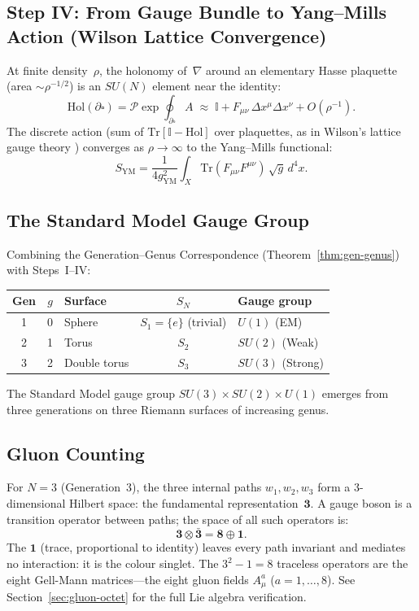 \documentclass[11pt, a4paper, openany]{book}
\newcounter{thm}[chapter]
\begin{document}
\subsection{Step IV: From Gauge Bundle to Yang--Mills Action
  (Wilson Lattice Convergence)}

At finite density~$\rho$, the holonomy of~$\nabla$ around an elementary
Hasse plaquette (area $\sim \rho^{-1/2}$) is an $SU(N)$ element near
the identity:
\[
  \mathrm{Hol}(\partial\square) = \mathcal{P}\exp\!\oint_{\partial\square}
  A \;\approx\; \mathbb{I} + F_{\mu\nu}\,\Delta x^\mu \Delta x^\nu
  + O(\rho^{-1}).
\]
The discrete action (sum of
$\mathrm{Tr}[\mathbb{I} - \mathrm{Hol}]$ over plaquettes, as in
Wilson's lattice gauge theory \cite{wilson1974}) converges as
$\rho \to \infty$ to the Yang--Mills functional:
\begin{equation}\label{eq:yang-mills}
  S_{\mathrm{YM}} = \frac{1}{4g_{\mathrm{YM}}^2}
  \int_X \mathrm{Tr}(F_{\mu\nu}F^{\mu\nu})\,\sqrt{g}\,d^4x.
\end{equation}

\subsection{The Standard Model Gauge Group}

Combining the Generation--Genus Correspondence
(Theorem~\ref{thm:gen-genus}) with Steps~I--IV:

\begin{center}\small
\begin{tabular}{@{}cclcl@{}}
\toprule
Gen & $g$ & Surface & $S_N$ & Gauge group \\
\midrule
1 & 0 & Sphere & $S_1 = \{e\}$ (trivial) & $U(1)$ (EM) \\
2 & 1 & Torus  & $S_2$ & $SU(2)$ (Weak) \\
3 & 2 & Double torus & $S_3$ & $SU(3)$ (Strong) \\
\bottomrule
\end{tabular}
\end{center}

\noindent
The Standard Model gauge group $SU(3) \times SU(2) \times U(1)$
emerges from three generations on three Riemann surfaces of
increasing genus.

\subsection{Gluon Counting}

For $N = 3$ (Generation~3), the three internal paths
$w_1, w_2, w_3$ form a 3-dimensional Hilbert space: the fundamental
representation~$\mathbf{3}$. A gauge boson is a transition operator
between paths; the space of all such operators is:
\[
  \mathbf{3} \otimes \bar{\mathbf{3}}
  = \mathbf{8} \oplus \mathbf{1}.
\]
The $\mathbf{1}$ (trace, proportional to identity) leaves every path
invariant and mediates no interaction: it is the colour singlet. The
$3^2 - 1 = 8$ traceless operators are the eight Gell-Mann
matrices---the eight gluon fields $A_\mu^a$ ($a = 1, \ldots, 8$).
See Section~\ref{sec:gluon-octet} for the full Lie algebra verification.
\end{document}
